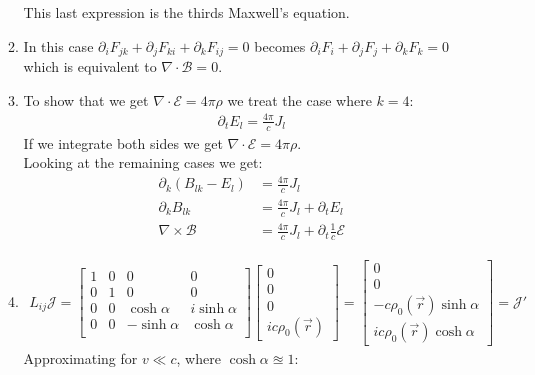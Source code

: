 \documentclass[12pt]{article}
\newcommand{\curl}{\nabla\times}
\newcommand{\divr}{\nabla\cdot}
\begin{document}
\begin{enumerate}
\begin{enumerate}
      This last expression is the thirds Maxwell's equation.
      \item In this case $\partial_i F_{jk}+\partial_j F_{ki}+\partial_k F_{ij}=0$ becomes $\partial_i F_{i}+\partial_j F_{j}+\partial_k F_{k}=0$ which is equivalent to $\divr\mathcal{B}=0$.
      \item To show that we get $\divr\mathcal{E}=4\pi\rho$ we treat the case where $k=4$:
      \begin{align*}
        \partial_t E_l=\frac{4\pi}{c}J_l
      \end{align*}
      If we integrate both sides we get $\divr\mathcal{E}=4\pi\rho$.\\
      Looking at the remaining cases we get:
      \begin{align*}
        \partial_k (B_{lk}-E_l)&=\frac{4\pi}{c}J_l\\
        \partial_k B_{lk}&=\frac{4\pi}{c}J_l+\partial_t E_l\\
        \curl\mathcal{B}&=\frac{4\pi}{c}J_l+\partial_t \frac{1}{c}\mathcal{E}
      \end{align*}
      \item
      \begin{gather*}
        L_{ij}\mathcal{J}=
        \begin{bmatrix}
          1 & 0 & 0            & 0            \\
          0 & 1 & 0            & 0            \\
          0 & 0 & \cosh\alpha  & i\sinh\alpha \\
          0 & 0 & -\sinh\alpha & \cosh\alpha  \\
        \end{bmatrix}
        \begin{bmatrix}
          0 \\
          0 \\
          0 \\
          ic\rho_0(\vec{r})
        \end{bmatrix}=
        \begin{bmatrix}
          0                            \\
          0                            \\
          -c\rho_0(\vec{r})\sinh\alpha \\
          ic\rho_0(\vec{r})\cosh\alpha
        \end{bmatrix}
        =\mathcal{J}'
      \end{gather*}
      Approximating for $v\ll c$, where $\cosh\alpha\approxeq1$:

\end{enumerate}
\end{enumerate}
\end{document}
